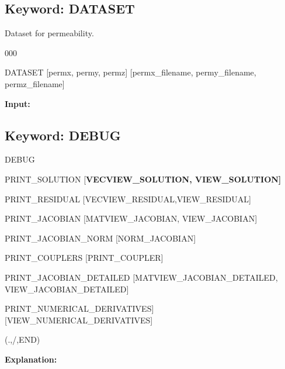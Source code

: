 \documentclass[12pt]{article}
\begin{document}

\newpage
\protect\hypertarget{target_datset}{}

\subsection{Keyword: DATASET}


 Dataset for permeability.

\begin{deflist}{000}
\item[DATASET] [permx, permy, permz] [permx\_filename, permy\_filename, permz\_filename]
\end{deflist}


\newpage
\protect\hypertarget{target_dbg}{}

{\noindent\bf Input:}

\subsection{Keyword: DEBUG}
\begin{deflist}{00}
\item[DEBUG]~
\begin{deflist}{00}
\item[PRINT\_SOLUTION] [\bf VECVIEW\_SOLUTION, VIEW\_SOLUTION]
\item[PRINT\_RESIDUAL] [VECVIEW\_RESIDUAL,VIEW\_RESIDUAL]
\item[PRINT\_JACOBIAN] [MATVIEW\_JACOBIAN, VIEW\_JACOBIAN]
\item[PRINT\_JACOBIAN\_NORM] [NORM\_JACOBIAN]
\item[PRINT\_COUPLERS] [PRINT\_COUPLER]
\item[PRINT\_JACOBIAN\_DETAILED] [MATVIEW\_JACOBIAN\_DETAILED, VIEW\_JACOBIAN\_DETAILED]
\item  PRINT\_NUMERICAL\_DERIVATIVES] [VIEW\_NUMERICAL\_DERIVATIVES]
\end{deflist}
\item[(.,/,END)]
\end{deflist}

{\noindent\bf Explanation:}
\end{document}

